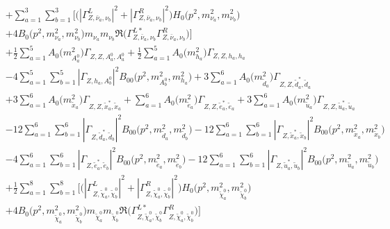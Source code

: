 \begin{itemize}
\begin{align}
 &+\sum_{a=1}^{3}\sum_{b=1}^{3} \Big[\Big(|{\Gamma^L_{Z,\bar{\nu}_{{a}},\nu_{{b}}}}|^2 + |{\Gamma^R_{Z,\bar{\nu}_{{a}},\nu_{{b}}}}|^2\Big){H_0\Big(p^{2},m^2_{\nu_{{a}}},m^2_{\nu_{{b}}}\Big)} \nonumber \\ & +4 {B_0\Big(p^{2},m^2_{\nu_{{a}}},m^2_{\nu_{{b}}}\Big)} m_{\nu_{{a}}} m_{\nu_{{b}}} {\Re\Big({\Gamma^{L*}_{Z,\bar{\nu}_{{a}},\nu_{{b}}}} {\Gamma^R_{Z,\bar{\nu}_{{a}},\nu_{{b}}}} \Big)} \Big]\nonumber \\ 
 &+\frac{1}{2} \sum_{a=1}^{5}{A_0\Big(m^2_{A^0_{{a}}}\Big)} {\Gamma_{Z,Z,A^0_{{a}},A^0_{{a}}}}  +\frac{1}{2} \sum_{a=1}^{5}{A_0\Big(m^2_{h_{{a}}}\Big)} {\Gamma_{Z,Z,h_{{a}},h_{{a}}}}  \nonumber \\ 
 &-4 \sum_{a=1}^{5}\sum_{b=1}^{5}|{\Gamma_{Z,h_{{a}},A^0_{{b}}}}|^2 {B_{00}\Big(p^{2},m^2_{A^0_{{b}}},m^2_{h_{{a}}}\Big)}  +3 \sum_{a=1}^{6}{A_0\Big(m^2_{\tilde{d}_{{a}}}\Big)} {\Gamma_{Z,Z,\tilde{d}^*_{{a}},\tilde{d}_{{a}}}}  \nonumber \\ 
 &+3 \sum_{a=1}^{6}{A_0\Big(m^2_{\tilde{x}_{{a}}}\Big)} {\Gamma_{Z,Z,\tilde{x}^*_{{a}},\tilde{x}_{{a}}}}  +\sum_{a=1}^{6}{A_0\Big(m^2_{\tilde{e}_{{a}}}\Big)} {\Gamma_{Z,Z,\tilde{e}^*_{{a}},\tilde{e}_{{a}}}} +3 \sum_{a=1}^{6}{A_0\Big(m^2_{\tilde{u}_{{a}}}\Big)} {\Gamma_{Z,Z,\tilde{u}^*_{{a}},\tilde{u}_{{a}}}}  \nonumber \\ 
 &-12 \sum_{a=1}^{6}\sum_{b=1}^{6}|{\Gamma_{Z,\tilde{d}^*_{{a}},\tilde{d}_{{b}}}}|^2 {B_{00}\Big(p^{2},m^2_{\tilde{d}_{{a}}},m^2_{\tilde{d}_{{b}}}\Big)}  -12 \sum_{a=1}^{6}\sum_{b=1}^{6}|{\Gamma_{Z,\tilde{x}^*_{{a}},\tilde{x}_{{b}}}}|^2 {B_{00}\Big(p^{2},m^2_{\tilde{x}_{{a}}},m^2_{\tilde{x}_{{b}}}\Big)}  \nonumber \\ 
 &-4 \sum_{a=1}^{6}\sum_{b=1}^{6}|{\Gamma_{Z,\tilde{e}^*_{{a}},\tilde{e}_{{b}}}}|^2 {B_{00}\Big(p^{2},m^2_{\tilde{e}_{{a}}},m^2_{\tilde{e}_{{b}}}\Big)}  -12 \sum_{a=1}^{6}\sum_{b=1}^{6}|{\Gamma_{Z,\tilde{u}^*_{{a}},\tilde{u}_{{b}}}}|^2 {B_{00}\Big(p^{2},m^2_{\tilde{u}_{{a}}},m^2_{\tilde{u}_{{b}}}\Big)}  \nonumber \\ 
 &+\frac{1}{2} \sum_{a=1}^{8}\sum_{b=1}^{8} \Big[\Big(|{\Gamma^L_{Z,\tilde{\chi}^0_{{a}},\tilde{\chi}^0_{{b}}}}|^2 + |{\Gamma^R_{Z,\tilde{\chi}^0_{{a}},\tilde{\chi}^0_{{b}}}}|^2\Big){H_0\Big(p^{2},m^2_{\tilde{\chi}^0_{{a}}},m^2_{\tilde{\chi}^0_{{b}}}\Big)} \nonumber \\ & +4 {B_0\Big(p^{2},m^2_{\tilde{\chi}^0_{{a}}},m^2_{\tilde{\chi}^0_{{b}}}\Big)} m_{\tilde{\chi}^0_{{a}}} m_{\tilde{\chi}^0_{{b}}} {\Re\Big({\Gamma^{L*}_{Z,\tilde{\chi}^0_{{a}},\tilde{\chi}^0_{{b}}}} {\Gamma^R_{Z,\tilde{\chi}^0_{{a}},\tilde{\chi}^0_{{b}}}} \Big)} \Big] \nonumber \\ 

\end{align}
\end{itemize}

